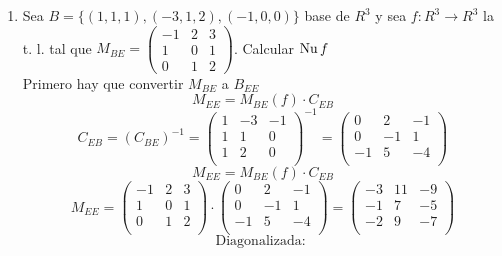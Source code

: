 \documentclass[../practica.root.tex]{subfiles}
\begin{document}
\begin{enumerate}
    \item Sea $B = \{(1,1,1),(-3,1,2),(-1,0,0)\}$ base de $R^3$ y sea $f : R^3 \to R^3$ la t. l. tal que $M_{BE} = \begin{pmatrix}
                  -1 & 2 & 3 \\ 1 & 0 & 1 \\ 0 & 1 & 2
              \end{pmatrix}$.
          Calcular $\operatorname{Nu} f$ \\
          Primero hay que convertir $M_{BE}$ a $B_{EE}$
          \[ M_{EE} = M_{BE}(f) \cdot C_{EB} \]
          \[
              C_{EB} = (C_{BE})^{-1} = \begin{pmatrix}
                  1 & -3 & -1 \\
                  1 & 1  & 0  \\
                  1 & 2  & 0  \\
              \end{pmatrix}^{-1} = \begin{pmatrix}
                  0  & 2  & -1 \\
                  0  & -1 & 1  \\
                  -1 & 5  & -4 \\
              \end{pmatrix}
          \] \[
              M_{EE} = M_{BE}(f) \cdot C_{EB}
          \] \[
              M_{EE} = \begin{pmatrix}
                  -1 & 2 & 3 \\
                  1  & 0 & 1 \\
                  0  & 1 & 2 \\
              \end{pmatrix}\cdot\begin{pmatrix}
                  0  & 2  & -1 \\
                  0  & -1 & 1  \\
                  -1 & 5  & -4 \\
              \end{pmatrix} = \begin{pmatrix}
                  -3 & 11 & -9 \\
                  -1 & 7  & -5 \\
                  -2 & 9  & -7 \\
              \end{pmatrix}
          \] \[
              \text{Diagonalizada: }
\]
\end{enumerate}
\end{document}
